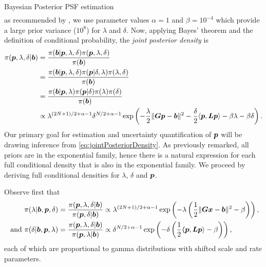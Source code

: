 \begin{chapter}{Bayesian Posterior PSF estimation}
\begin{align}
\end{align}
as recommended by \citep{higdon2006primer}, we use parameter values $\alpha = 1$ and $\beta =  10^{-4}$ which provide a large prior variance ($10^8$) for $\lambda$ and $\delta$. 
Now, applying Bayes' theorem and the definition of conditional probability, the \emph{joint posterior density} is
\begin{align}
\pi(\mbox{\boldmath$p$},\lambda,\delta|\mbox{\boldmath$b$}) 
&= \frac{\pi(\mbox{\boldmath$b$}|\mbox{\boldmath$p$},\lambda,\delta) \pi(\mbox{\boldmath$p$},\lambda,\delta)}{\pi(\mbox{\boldmath$b$})} \nonumber \\
&= \frac{\pi(\mbox{\boldmath$b$}|\mbox{\boldmath$p$},\lambda,\delta) \pi(\mbox{\boldmath$p$}| \delta,\lambda) \pi(\lambda,\delta)}{\pi(\mbox{\boldmath$b$})} \nonumber \\
&= \frac{\pi(\mbox{\boldmath$b$}|\mbox{\boldmath$p$},\lambda) \pi(\mbox{\boldmath$p$}| \delta) \pi(\lambda)\pi(\delta)}{\pi(\mbox{\boldmath$b$})} \nonumber \\
&\propto \lambda^{(2N+1)/2+\alpha-1}\delta^{N/2+\alpha-1} \exp\left(-\frac{\lambda}{2}\|\mbox{\boldmath$Gp$} - \mbox{\boldmath$b$}\|^2 - \frac{\delta}{2}\langle \mbox{\boldmath$p$}, \mbox{\boldmath$L$} \mbox{\boldmath$p$}\rangle - \beta\lambda - \beta\delta \right). \label{eq:jointPosteriorDensity}
\end{align}
Our primary goal for estimation and uncertainty quantification of $\mbox{\boldmath$p$}$ will be drawing inference from \eqref{eq:jointPosteriorDensity}.
As previously remarked, all priors are in the exponential family, hence there is a natural expression for each full conditional density that is also in the exponential family.
We proceed by deriving full conditional densities for $\lambda$, $\delta$ and $\mbox{\boldmath$p$}$.

Observe first that
\begin{align}
  \pi(\lambda| \mbox{\boldmath$b$},\mbox{\boldmath$p$},\delta) 
  &= \frac{\pi(\mbox{\boldmath$p$},\lambda,\delta|\mbox{\boldmath$b$})}{\pi(\mbox{\boldmath$p$},\delta|\mbox{\boldmath$b$}) } 
  \propto \lambda^{(2N+1)/2+\alpha-1}\exp\left(-\lambda\left(\frac{1}{2}\|\mbox{\boldmath$Gx$} - \mbox{\boldmath$b$}\|^2 - \beta\right)  \right), \nonumber\\
\text{ and }\pi(\delta| \mbox{\boldmath$b$},\mbox{\boldmath$p$},\lambda) 
  &= \frac{\pi(\mbox{\boldmath$p$},\lambda,\delta|\mbox{\boldmath$b$})}{\pi(\mbox{\boldmath$p$},\lambda|\mbox{\boldmath$b$}) } 
  \propto \delta^{N/2+\alpha-1}\exp\left(-\delta\left(\frac{1}{2}\mbox{\boldmath$\langle$} \mbox{\boldmath$p$},\mbox{\boldmath$L$}\mbox{\boldmath$p$} \rangle- \beta\right)  \right), \label{eq:lambdaDeltaConditional} 
\end{align}
each of which are proportional to gamma distributions with shifted scale and rate parameters.
 

\end{chapter}
